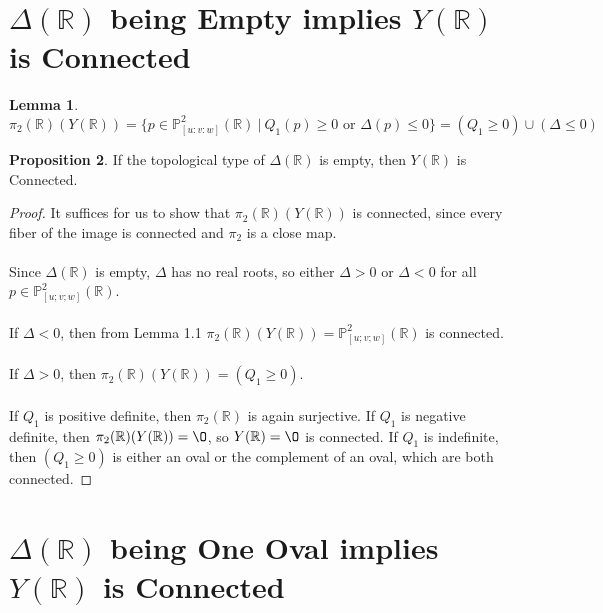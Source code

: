\documentclass{article}
\newcommand{\Rbb}{\mathbb{R}}
\newcommand{\Pbb}{\mathbb{P}}
\begin{document}
\theoremstyle{definition}
\newtheorem{theorem}{Theorem}[section]
\theoremstyle{definition}
\newtheorem{conjecture}[theorem]{Conjecture}
\theoremstyle{definition}
\newtheorem{definition}[theorem]{Definition}
\theoremstyle{definition}
\newtheorem{goal}[theorem]{Goal}
\theoremstyle{definition}
\newtheorem{corollary}[theorem]{Corollary}
\theoremstyle{definition}
\newtheorem{question}[theorem]{Question}
\theoremstyle{definition}
\newtheorem{lemma}[theorem]{Lemma}
\theoremstyle{definition}
\newtheorem{proposition}[theorem]{Proposition}

\section{$\Delta(\Rbb)$ being Empty implies $Y(\Rbb)$ is Connected}

\begin{lemma}
$\pi_2(\Rbb)(Y(\Rbb)) = \{p \in \Pbb^2_{[u:v:w]}(\Rbb)\ |\ Q_1(p) \geq 0 \text{ or } \Delta(p) \leq 0\} = (Q_1 \geq 0) \cup (\Delta \leq 0)$
\end{lemma}

\begin{proposition}
If the topological type of $\Delta(\Rbb)$ is empty, then $Y(\Rbb)$ is Connected.
\end{proposition}

\begin{proof}
It suffices for us to show that $\pi_2(\Rbb)(Y(\Rbb))$ is connected, since every fiber of the image is connected and $\pi_2$ is a close map.\\\\
Since $\Delta(\Rbb)$ is empty, $\Delta$ has no real roots, so either $\Delta > 0$ or $\Delta < 0$ for all $p \in \Pbb^2_{[u;v;w]}(\Rbb)$.\\\\
If $\Delta < 0$, then from Lemma 1.1 $\pi_2(\Rbb)(Y(\Rbb)) = \Pbb^2_{[u;v;w]}(\Rbb)$ is connected.\\\\
If $\Delta > 0$, then $\pi_2(\Rbb)(Y(\Rbb)) = (Q_1 \geq 0)$.\\\\
If $Q_1$ is positive definite, then $\pi_2(\Rbb)$ is again surjective. If $Q_1$ is negative definite, then $\pi_2(\Rbb)(Y(\Rbb)) = \O$, so $Y(\Rbb) = \O$ is connected. If $Q_1$ is indefinite, then $(Q_1 \geq 0)$ is either an oval or the complement of an oval, which are both connected.
\end{proof}

\section{$\Delta(\Rbb)$ being One Oval implies $Y(\Rbb)$ is Connected}
\end{document}
